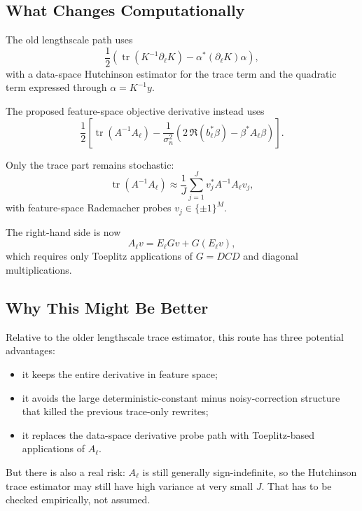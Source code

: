 \documentclass[11pt]{article}
\begin{document}
\subsection*{What Changes Computationally}

The old lengthscale path uses
\begin{equation}
\frac{1}{2}
\left(
\operatorname{tr}(K^{-1}\partial_\ell K)
-
\alpha^\ast (\partial_\ell K)\alpha
\right),
\end{equation}
with a data-space Hutchinson estimator for the trace term and the quadratic
term expressed through $\alpha = K^{-1} y$.

The proposed feature-space objective derivative instead uses
\begin{equation}
\frac{1}{2}\left[
\operatorname{tr}(A^{-1} A_\ell)
-
\frac{1}{\sigma_n^2}
\left(
2\,\Re(b_\ell^\ast \beta)
-
\beta^\ast A_\ell \beta
\right)
\right].
\end{equation}

Only the trace part remains stochastic:
\begin{equation}
\operatorname{tr}(A^{-1} A_\ell)
\approx
\frac{1}{J}\sum_{j=1}^J v_j^\ast A^{-1} A_\ell v_j,
\end{equation}
with feature-space Rademacher probes $v_j \in \{\pm 1\}^M$.

The right-hand side is now
\begin{equation}
A_\ell v
=
E_\ell G v + G(E_\ell v),
\end{equation}
which requires only Toeplitz applications of $G = D C D$ and diagonal
multiplications.

\subsection*{Why This Might Be Better}

Relative to the older lengthscale trace estimator, this route has three
potential advantages:
\begin{itemize}
  \item it keeps the entire derivative in feature space;
  \item it avoids the large deterministic-constant minus noisy-correction
  structure that killed the previous trace-only rewrites;
  \item it replaces the data-space derivative probe path with Toeplitz-based
  applications of $A_\ell$.
\end{itemize}

But there is also a real risk: $A_\ell$ is still generally sign-indefinite, so
the Hutchinson trace estimator may still have high variance at very small $J$.
That has to be checked empirically, not assumed.
\end{document}
